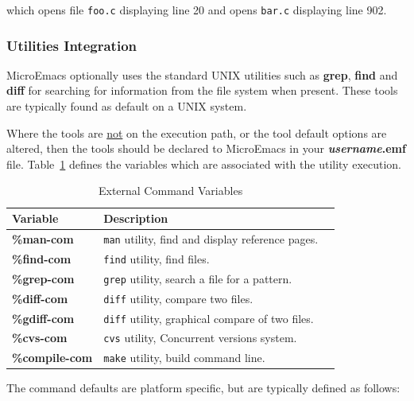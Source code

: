 \documentclass[11pt,a4paper,pdftex]{article}
\begin{document}

  which opens file \texttt{foo.c} displaying line 20 and opens \texttt{bar.c}
  displaying line 902.

\subsubsection{Utilities Integration}

  MicroEmacs optionally uses the standard UNIX utilities such as
  \textbf{grep}, \textbf{find} and \textbf{diff} for searching for information
  from the file system when present. These tools are typically found as
  default on a UNIX system.

  Where the tools are \underline{not} on the execution path, or the tool
  default options are altered, then the tools should be declared to MicroEmacs
  in your \textbf{\textit{username}.emf} file. Table~\ref{tab:com} defines
  the variables which are associated with the utility execution.

  \begin{table}[ht]
   \begin{center}
    \begin{tabular}{lll}
    \textbf{Variable} & \textbf{Description} \\ \hline
    \textbf{\%man-com} & \texttt{man} utility, find and display reference pages.\\
    \textbf{\%find-com} & \texttt{find} utility, find files.\\
    \textbf{\%grep-com} & \texttt{grep} utility, search a file for a pattern.\\
    \textbf{\%diff-com} & \texttt{diff} utility, compare two files.\\
    \textbf{\%gdiff-com} & \texttt{diff} utility, graphical compare of two files.\\
    \textbf{\%cvs-com} & \texttt{cvs} utility, Concurrent versions system.\\
    \textbf{\%compile-com} & \texttt{make} utility, build command line. \\ \hline
    \end{tabular}
    \caption{External Command Variables}
    \label{tab:com}
   \end{center}
  \end{table}

  The command defaults are platform specific, but are typically defined as
  follows:

\end{document}
